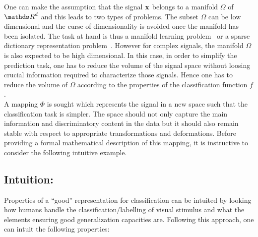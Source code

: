 \documentclass[a4paper,11pt]{report}
\begin{document}
		One can make the assumption that the signal ${\bf x}$ belongs to a manifold $\Omega$ of $\dsR^{d}$ and this leads to two types of problems. The subset $\Omega$ can be low dimensional and the curse of dimensionality is avoided once the manifold has been isolated. The task at hand is thus a manifold learning problem~\citep{lin2008riemannian} \citep{zhang2012adaptive} or a sparse dictionary representation problem~\citep{kreutz2003dictionary}. However for complex signals, the manifold $\Omega$ is also expected to be high dimensional. In this case, in order to simplify the prediction task, one has to reduce the volume of the signal space without loosing crucial information required to characterize those signals. Hence one has to reduce the volume of $\Omega$ according to the properties of the classification function $f$.\\
		
		A mapping $\Phi$ is sought which represents the signal in a new space such that the classification task is simpler. The space should not only capture the main information and discriminatory content in the data but it should also remain stable with respect to appropriate transformations and deformations. Before providing a formal mathematical description of this mapping, it is instructive to consider the following intuitive example.
    
		\subsection{Intuition:}
      \label{sec:Intro/Signal rep/Intuition}
      
      Properties of a ``good'' representation for classification can be intuited by looking how humans handle the classification/labelling of visual stimulus and what the elements ensuring good generalization capacities are. Following this approach, one can intuit the following properties:\\
            
\end{document}
